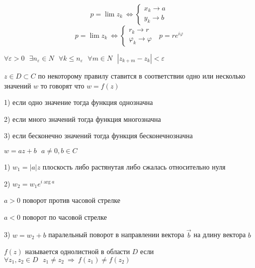 \begin{block}
  $$
  p = \lim z_k ~ \Leftrightarrow
  \left\{
  \begin{array}{l}
    x_k \to a \\
    y_k \to b
  \end{array}
  \right.
  $$
  $$
  p = \lim z_k ~ \Leftrightarrow
  \left\{
  \begin{array}{l}
    r_k \to r \\
    \varphi_k \to \varphi
  \end{array}
  \right. ~~~ p = re^{i\varphi}
  $$
\end{block}

\begin{block}
  $\forall \varepsilon > 0 ~~~ \exists n_{\varepsilon} \in N ~~~
  \forall k \le n_{\varepsilon} ~~~ \forall m \in N ~~~ |z_{k+m} - z_k| <
  \varepsilon$
\end{block}

\begin{define}
  $z \in D \subset C$ по некоторому правилу ставится в соответствии одно или
  несколько значений $w$ то говорят что $w = f(z)$

  1) если одно значение тогда функция однозначна

  2) если много значений тогда функция многозначна

  3) если бесконечно значений тогда функция бесконечнозначна
\end{define}

\begin{block}[Свойства $w = az + b$]
  $w = az + b ~~~ a \not = 0,b \in C$

  1) $w_1 = |a| z$ плоскость либо растянутая либо сжалась относительно нуля

  2) $w_2 = w_1 e^{i \arg a}$

  $a > 0$ поворот против часовой стрелке

  $a < 0$ поворот по часовой стрелке

  3) $w = w_2 + b$ паралельный поворот в направлении вектора $\vec b$ на длину
  вектора $b$
\end{block}

\begin{define}
  $f(z)$ называется однолистной в области $D$ если $\forall z_1, z_2 \in D ~~~
  z_1 \not = z_2 ~ \Rightarrow ~ f(z_1) \not = f(z_2)$
\end{define}

